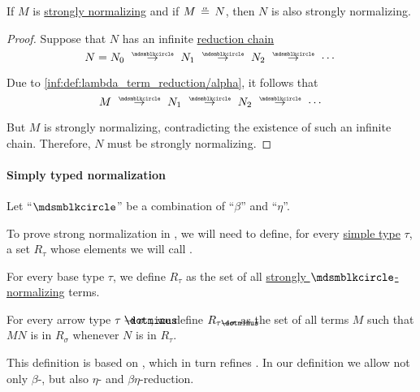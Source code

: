 \begin{proposition}\label{thm:strong_normalization_of_alpha_equivalent_term}
  If \( M \) is \hyperref[def:strongly_normalizing_lambda_term]{strongly normalizing} and if \( M \aequiv N \), then \( N \) is also strongly normalizing.
\end{proposition}
\begin{proof}
  Suppose that \( N \) has an infinite \hyperref[def:lambda_term_reduction_graph]{reduction chain}
  \begin{equation*}
    N = N_0 \pred N_1 \pred N_2 \pred \cdots
  \end{equation*}

  Due to \ref{inf:def:lambda_term_reduction/alpha}, it follows that
  \begin{equation*}
    M \pred N_1 \pred N_2 \pred \cdots
  \end{equation*}

  But \( M \) is strongly normalizing, contradicting the existence of such an infinite chain. Therefore, \( N \) must be strongly normalizing.
\end{proof}

\paragraph{Simply typed normalization}

\begin{definition}\label{def:strong_normalization_reducibility_candidate}
  Let \enquote{\( {\Anon} \)} be a combination of \enquote{\( \beta \)} and \enquote{\( \eta \)}.

  To prove strong normalization in , we will need to define, for every \hyperref[def:simple_type]{simple type} \( \tau \), a set \( R_\tau \) whose elements we will call .

  \begin{thmenum}
     For every base type \( \tau \), we define \( R_\tau \) as the set of all \hyperref[def:strongly_normalizing_lambda_term]{strongly \( \Anon \)-normalizing} terms.

     For every arrow type \( \tau \synimplies \sigma \) , we define \( R_{\tau \synimplies \sigma} \) as the set of all terms \( M \) such that \( MN \) is in \( R_\sigma \) whenever \( N \) is in \( R_\tau \).
  \end{thmenum}
\end{definition}
\begin{comments}
  \item This definition is based on , which in turn refines . In our definition we allow not only \( \beta \)-, but also \( \eta \)- and \( \beta\eta \)-reduction.
\end{comments}

